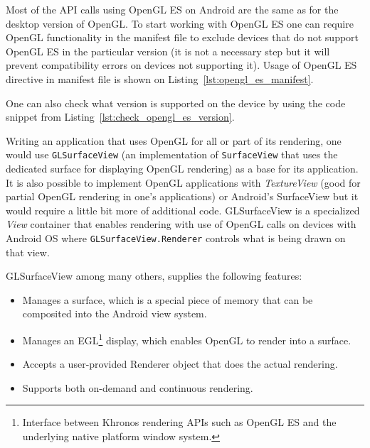 
Most of the API calls using OpenGL ES on Android are the same as for the desktop version of OpenGL. 
To start working with OpenGL ES one can require OpenGL functionality in the manifest file to exclude devices that do not support OpenGL ES in the particular version (it is not a necessary step but it will prevent compatibility errors on devices not supporting it).
Usage of OpenGL ES directive in manifest file is shown on Listing~\ref{lst:opengl_es_manifest}.



%  

One can also check what version is supported on the device by using the code snippet from Listing~\ref{lst:check_opengl_es_version}.
\begin{filecode}[label=lst:check_opengl_es_version,caption=Checking OpenGL ES version support on the device.]
  
\end{filecode}

%

Writing an application that uses OpenGL for all or part of its rendering, one would use \texttt{GLSurfaceView} (an implementation of \texttt{SurfaceView} that uses the dedicated surface for displaying OpenGL rendering) \cite{android_glsurfaceview} as a base for its application.
It is also possible to implement OpenGL applications with \emph{TextureView} (good for partial OpenGL rendering in one's applications) or Android's SurfaceView but it would require a little bit more of additional code.
\newline GLSurfaceView is a specialized \emph{View} container that enables rendering with use of OpenGL calls on devices with Android OS where \texttt{GLSurfaceView.Renderer} controls what is being drawn on that view.

GLSurfaceView among many others, supplies the following features:
\begin{itemize}
\item Manages a surface, which is a special piece of memory that can be composited into the Android view system.
\item Manages an EGL\footnote{Interface between Khronos rendering APIs such as OpenGL ES and the underlying native platform window system.} display, which enables OpenGL to render into a surface.
\item Accepts a user-provided Renderer object that does the actual rendering.
\item Supports both on-demand and continuous rendering.
\end{itemize}

